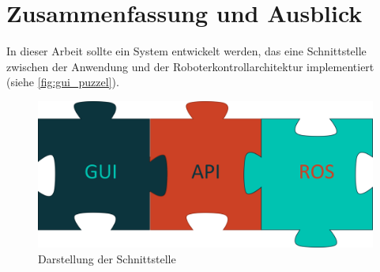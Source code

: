 \chapter{Zusammenfassung und Ausblick}
In dieser Arbeit sollte ein System entwickelt werden, das eine Schnittstelle zwischen der Anwendung und der Roboterkontrollarchitektur implementiert (siehe \autoref{fig:gui_puzzel}). 

 \begin{figure}[H]
 \centering
 \includegraphics[width=\linewidth]{Bilder/Ausblick/api_bridge.png}
 \caption{Darstellung der Schnittstelle}
 \label{fig:gui_puzzel}
\end{figure}

